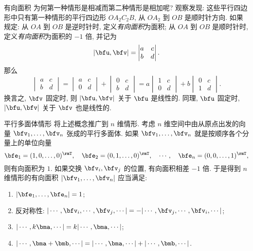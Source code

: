 \begin{frame}{有向面积\noexer}
	\onslide<+->
	为何第一种情形是相减而第二种情形是相加呢?
	\onslide<+->
	观察发现: 这些平行四边形中只有第一种情形的平行四边形 $OA_2C_2B$, 从 $OA_2$ 到 $OB$ 是顺时针方向.
	\onslide<+->
	如果规定: 从 $OA$ 到 $OB$ 是逆时针时, 定义\emph{有向面积}为面积; 从 $OA$ 到 $OB$ 是顺时针时, 定义\emph{有向面积}为面积的 $-1$ 倍,
	\onslide<+->
	并记为
	\[|\bfu,\bfv|=\begin{vmatrix}
		a&c\\b&d
	\end{vmatrix}.\]
	\onslide<+->
	那么
	\[\begin{vmatrix}
		a&c\\b&d
	\end{vmatrix}=\begin{vmatrix}
		a&c\\0&d
	\end{vmatrix}+\begin{vmatrix}
		0&c\\b&d
	\end{vmatrix}=a\begin{vmatrix}
		1&c\\0&d
	\end{vmatrix}+b\begin{vmatrix}
		0&c\\1&d
	\end{vmatrix}.\]
	\onslide<+->
	换言之, $\bfv$ 固定时, 则 $|\bfu,\bfv|$ 关于 $\bfu$ 是线性的.
	\onslide<+->
	同理, $\bfu$ 固定时, $|\bfu,\bfv|$ 关于 $\bfv$ 也是线性的.
\end{frame}


\begin{frame}{平行多面体情形\noexer}
	\onslide<+->
	将上述概念推广到 $n$ 维情形.
	\onslide<+->
	考虑 $n$ 维空间中由从原点出发的向量 $\bfv_1,\dots,\bfv_n$ 张成的平行多面体.
	\onslide<+->
	如果 $\bfv_1,\dots,\bfv_n$ 就是按顺序各个分量上的单位向量
	\[\bfe_1=(1,0,\dots,0)^\rmT,\quad
	\bfe_2=(0,1,\dots,0)^\rmT,\quad\cdots,\quad
	\bfe_n=(0,0,\dots,1)^\rmT,\]
	则有向面积为 $1$.
	\onslide<+->
	如果交换 $\bfv_i,\bfv_j$ 的位置, 有向面积相差 $-1$ 倍.
	\onslide<+->
	于是得到 $n$ 维情形的有向面积 $|\bfv_1,\dots,\bfv_n|$ 应当满足:
	\begin{enumerate}
		\item $|\bfe_1,\dots,\bfe_n|=1$;
		\item 反对称性: $|\cdots,\bfv_i,\cdots,\bfv_j,\cdots|=-|\cdots,\bfv_j,\cdots,\bfv_i,\cdots|$;
		\item $|\cdots,k\bma,\cdots|=k|\cdots,\bma,\cdots|$;
		\item $|\cdots,\bma+\bmb,\cdots|=|\cdots,\bma,\cdots|+|\cdots,\bmb,\cdots|$.
	\end{enumerate}
\end{frame}


